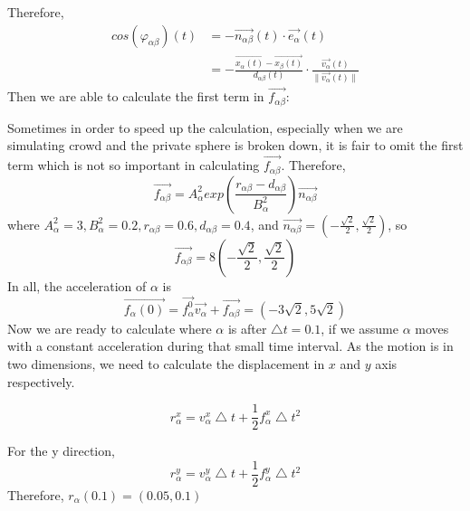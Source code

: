 Therefore,
\begin{equation}
\begin{split}
cos(\varphi_{\alpha\beta})(t)&= -\overrightarrow{n_{\alpha \beta}}(t)\cdot\overrightarrow{e_{\alpha}}(t)\\
&=-\frac{\overrightarrow{x_{\alpha}(t)}-\overrightarrow{x_{\beta}(t)}}{d_{\alpha \beta}(t)}\cdot\frac{\overrightarrow{v_{\alpha}}(t)}{\parallel \overrightarrow{v_{\alpha}}(t)\parallel}
\end{split}
\end{equation}
Then we are able to calculate the first term in $ \overrightarrow{f_{\alpha\beta}} $:

Sometimes in order to speed up the calculation, especially when we are simulating crowd and the private sphere is broken down, it is fair to omit the first term which is not so important in calculating $\overrightarrow{f_{\alpha \beta}}$.
Therefore,
 \begin{equation}
 \overrightarrow{f_{\alpha \beta}} = A^{2}_{\alpha} exp(\frac{r_{\alpha\beta}-d_{\alpha\beta}}{B^{2}_{\alpha}})\overrightarrow{n_{\alpha \beta}}
 \end{equation}
where $A^{2}_{\alpha}=3, B^{2}_{\alpha}=0.2, r_{\alpha\beta}=0.6, d_{\alpha\beta}=0.4$, and $\overrightarrow{n_{\alpha \beta}}=(-\frac{\sqrt{2}}{2}, \frac{\sqrt{2}}{2})$,
so 
 \begin{equation}
 \overrightarrow{f_{\alpha \beta}} = 8(-\frac{\sqrt{2}}{2}, \frac{\sqrt{2}}{2})
 \end{equation}
In all, the acceleration of $\alpha$ is 
 \begin{equation}
 \overrightarrow{f_{\alpha}(0)} = \overrightarrow{f^{0}_{\alpha}}\overrightarrow{v_{\alpha}} + \overrightarrow{f_{\alpha\beta}} = (-3\sqrt{2}, 5\sqrt{2})
 \end{equation}
Now we are ready to calculate where $\alpha$ is after $\bigtriangleup t=0.1$, if we assume $\alpha$ moves with a constant acceleration during that small time interval.
As the motion is in two dimensions, we need to calculate the displacement in $x$ and $y$ axis respectively.

 \begin{equation}
 r^{x}_{\alpha} = v^{x}_{\alpha} \bigtriangleup t + \frac{1}{2} f^{x}_{\alpha} \bigtriangleup t ^{2}
 \end{equation}
 
 For the y direction,
  \begin{equation}
 r^{y}_{\alpha} = v^{y}_{\alpha} \bigtriangleup t + \frac{1}{2} f^{y}_{\alpha} \bigtriangleup t ^{2}
 \end{equation}
 Therefore, $r_{\alpha}(0.1)= (0.05, 0.1)$



